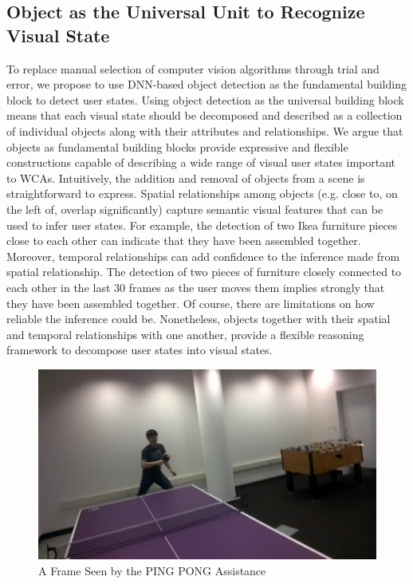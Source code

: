 \subsection{Object as the Universal Unit to Recognize Visual State}

To replace manual selection of computer vision algorithms through trial and
error, we propose to use DNN-based object detection as the fundamental building
block to detect user states. Using object detection as the universal building
block means that each visual state should be decomposed and described as a
collection of individual objects along with their attributes and relationships.
We argue that objects as fundamental building blocks provide expressive and
flexible constructions capable of describing a wide range of visual user states
important to WCAs. Intuitively, the addition and removal of objects from a scene
is straightforward to express. Spatial relationships among objects (e.g. close
to, on the left of, overlap significantly) capture semantic visual features that
can be used to infer user states. For example, the detection of two Ikea
furniture pieces close to each other can indicate that they have been assembled
together. Moreover, temporal relationships can add confidence to the inference
made from spatial relationship. The detection of two pieces of furniture closely
connected to each other in the last 30 frames as the user moves them implies
strongly that they have been assembled together. Of course, there are
limitations on how reliable the inference could be. Nonetheless, objects
together with their spatial and temporal relationships with one another, provide
a flexible reasoning framework to decompose user states into visual states.

\begin{figure}
  \centering
  \includegraphics[trim={0 0 0 0},width=.9\linewidth]{FIGS/pingpong}
	\caption{A Frame Seen by the PING PONG Assistance}
    \label{figs:pingpong-frame}
\end{figure}

